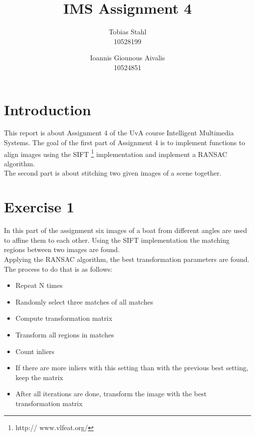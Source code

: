 \documentclass[11pt]{article}
\title{
	\textbf{IMS Assignment 4}
}
\author{Tobias Stahl \\ 10528199 \and Ioannis Giounous Aivalis \\ 10524851 }
\begin{document}
\maketitle

\section{Introduction}
This report is about Assignment 4 of the UvA course Intelligent Multimedia Systems. The goal of the first part of Assignment 4 is to implement functions to align images using the SIFT \footnote{http://
www.vlfeat.org/} implementation and implement a RANSAC algorithm.\\
The second part is about stitching two given images of a scene together.

\section{Exercise 1}
In this part of the assignment six images of a boat from different angles are used to affine them to each other. Using the SIFT implementation the matching regions between two images are found.\\
Applying the RANSAC algorithm, the best transformation parameters are found. The process to do that is as follows:

\begin{itemize}
	\item 	Repeat N times
	\item	Randomly select three matches of all matches
	\item	Compute transformation matrix
	\item	Transform all regions in matches
	\item	Count inliers
	\item	If there are more inliers with this setting than with the previous best setting, keep the 			matrix
	\item	After all iterations are done, transform the image with the best transformation matrix
\end{itemize}
\end{document}
